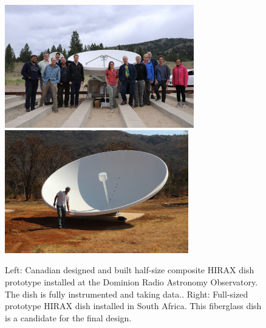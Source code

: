 \documentclass[11pt]{article}
\begin{document}

\begin{figure}[t]
  \includegraphics[height=2.1in]{d3a_team.jpg}
  \includegraphics[height=2.1in]{mms_dish_kavi_small.jpg}
\caption{\small Left:  Canadian designed and built half-size composite
  HIRAX dish prototype installed at the Dominion Radio Astronomy
  Observatory.  The dish is fully instrumented and taking data..
  Right: Full-sized prototype HIRAX dish installed in South Africa.  This
  fiberglass dish is a candidate for the final design.
  \label{fig:hirax_dishes}
}
\end{figure}
\end{document}
